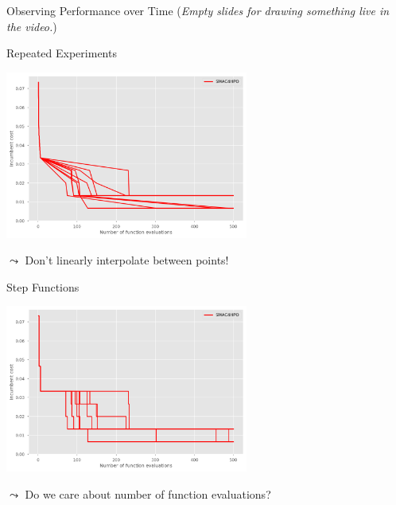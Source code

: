
\begin{frame}{Observing Performance over Time}
	(\textit{Empty slides for drawing something live in the video.})
\end{frame}


\begin{frame}[c]{Repeated Experiments}

	\centering
	\includegraphics[width=0.6\textwidth]{plots/evaluations/4_smac4hpo.png}

	\pause
	$\leadsto$ Don't linearly interpolate between points!

\end{frame}


\begin{frame}[c]{Step Functions}
	
	\centering
	\includegraphics[width=0.6\textwidth]{plots/evaluations/5_smac4hpo_step.png}
	
	\pause
	$\leadsto$ Do we care about number of function evaluations?
	
\end{frame}

